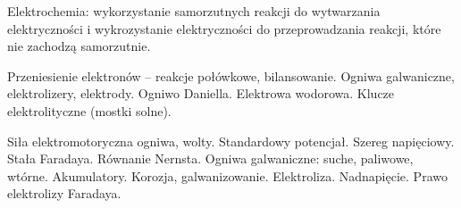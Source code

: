 Elektrochemia: wykorzystanie samorzutnych reakcji do wytwarzania elektryczności i wykrozystanie elektryczności do przeprowadzania reakcji, które nie zachodzą samorzutnie.

Przeniesienie elektronów -- reakcje połówkowe, bilansowanie.
Ogniwa galwaniczne, elektrolizery, elektrody.
Ogniwo Daniella.
Elektrowa wodorowa.
Klucze elektrolityczne (mostki solne).

Siła elektromotoryczna ogniwa, wolty.
Standardowy potencjał.
Szereg napięciowy.
Stała Faradaya.
Równanie Nernsta.
Ogniwa galwaniczne: suche, paliwowe, wtórne.
Akumulatory.
Korozja, galwanizowanie.
Elektroliza.
Nadnapięcie.
Prawo elektrolizy Faradaya.
